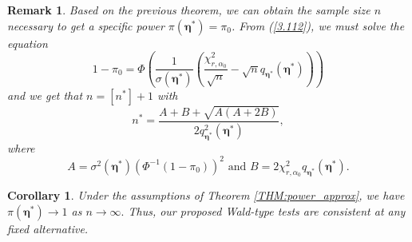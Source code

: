\documentclass[a4paper]{article}%
\newtheorem{corollary}[theorem]{Corollary}
\newtheorem{remark}[theorem]{Remark}
\begin{document}
\begin{remark}
Based on the previous theorem, we can obtain the sample size $n$ necessary to get
a specific power $\pi\left(  \boldsymbol{\eta}^{\ast}\right)  =\pi_{0}$. From
(\ref{3.112}), we must solve the equation
\[
1-\pi_{0}=\Phi\left(  \frac{1}{\sigma\left(  \boldsymbol{\eta}^{\ast}\right)
}\left(  \frac{\chi_{r,\alpha_0}^{2}}{\sqrt{n}}-\sqrt{n}q_{\boldsymbol{\eta
}^{\ast}}(\boldsymbol{\eta}^{\ast})\right)  \right)
\]
and we get that $n=\left[  n^{\ast}\right]  +1$ with
\[
n^{\ast}=\frac{A+B+\sqrt{A(A+2B)}}{2q_{\boldsymbol{\eta}^{\ast}}%
^{2}(\boldsymbol{\eta}^{\ast})},
\]
where
\[
A=\sigma^{2}\left(  \boldsymbol{\eta}^{\ast}\right)  \left(  \Phi^{-1}\left(
1-\pi_{0}\right)  \right)  ^{2}\text{ and }B=2\chi_{r,\alpha_0}^{2}%
q_{\boldsymbol{\eta}^{\ast}}(\boldsymbol{\eta}^{\ast}).
\]

\end{remark}

\begin{corollary}
Under the assumptions of Theorem \ref{THM:power_approx}, we have $\pi\left(
\boldsymbol{\eta}^{\ast}\right)  \rightarrow1$ as $n\rightarrow\infty.$ Thus,
our proposed Wald-type tests are consistent at any fixed alternative.
\label{CORR:consistency}
\end{corollary}
\end{document}
